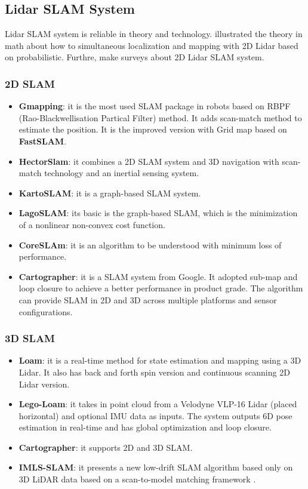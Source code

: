 \documentclass[journal,transmag]{IEEEtran}
\begin{document}
\subsection{Lidar SLAM System}
Lidar SLAM system is reliable in theory and technology. \cite{thrun2005probabilistic} illustrated the theory in math about how to simultaneous localization and mapping with 2D Lidar based on probabilistic. Furthre, \cite{santos2013evaluation} make surveys about 2D Lidar SLAM system. 
\subsubsection{2D SLAM}
\begin{itemize}
    \item \textbf{Gmapping}: it is the most used SLAM package in robots based on RBPF (Rao-Blackwellisation Partical Filter) method. It adds scan-match method to estimate the position\cite{grisetti2007improved}\cite{thrun2005probabilistic}. It is the improved version with Grid map based on \textbf{FastSLAM}\cite{montemerlo2002fastslam}\cite{montemerlo2003fastslam}.
    \item \textbf{HectorSlam}: it combines a 2D SLAM system  and 3D navigation with scan-match technology and an inertial sensing system\cite{kohlbrecher2011flexible}.
    \item \textbf{KartoSLAM}: it is a graph-based SLAM system\cite{konolige2010efficient}. 
    \item \textbf{LagoSLAM}: its basic is the graph-based SLAM, which is the minimization of a nonlinear non-convex cost function\cite{carlone2012linear}. 
    \item \textbf{CoreSLAm}: it is an algorithm to be understood with minimum loss of performance\cite{steux2010slam}. 
    \item \textbf{Cartographer}: it is a SLAM system from Google\cite{hess2016real}. It adopted sub-map and loop closure to achieve a better performance in product grade. The algorithm can provide SLAM in 2D and 3D across multiple platforms and sensor configurations.
\end{itemize}
\subsubsection{3D SLAM}
\begin{itemize}
    \item \textbf{Loam}: it is a real-time method for state estimation and mapping using a 3D Lidar\cite{zhang2014loam}. It also has back and forth spin version and continuous scanning 2D Lidar version.
    \item \textbf{Lego-Loam}: it takes in point cloud from a Velodyne VLP-16 Lidar (placed horizontal) and optional IMU data as inputs. The system outputs 6D pose estimation in real-time and has global optimization and loop closure\cite{shan2018lego}.
    \item \textbf{Cartographer}: it supports 2D and 3D SLAM\cite{hess2016real}.
    \item \textbf{IMLS-SLAM}: it presents a new low-drift SLAM algorithm based only on 3D LiDAR data based on a scan-to-model matching framework \cite{deschaud2018imls}.
\end{itemize}
\end{document}
